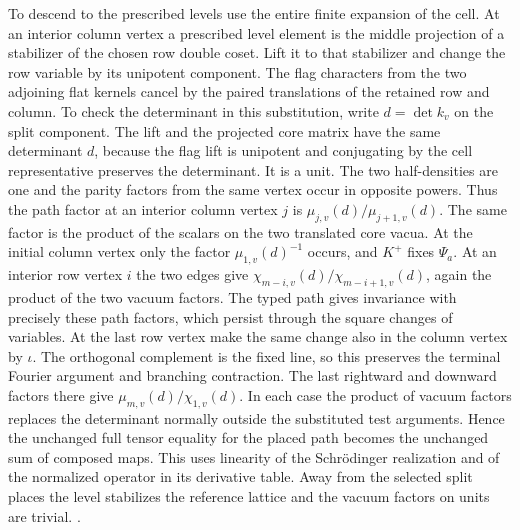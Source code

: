 To descend to the prescribed levels use the entire finite
expansion of the cell. At an interior column vertex a
prescribed level element is the middle projection of a
stabilizer of the chosen row double coset. Lift it to that
stabilizer and change the row variable by its unipotent
component. The flag characters from the two
adjoining flat kernels cancel by the paired translations of the
retained row and column. To check the determinant in this
substitution, write \(d=\det k_v\) on the split component.
The lift and the projected core matrix have the same
determinant \(d\), because the flag lift is unipotent and
conjugating by the cell representative preserves the
determinant. It is a unit. The two half-densities are
one and the parity factors from the same vertex occur
in opposite powers. Thus the path factor at an interior
column vertex \(j\) is
\(\mu_{j,v}(d)/\mu_{j+1,v}(d)\). The same factor is the
product of the scalars on the two translated core vacua.
At the initial column vertex only the factor
\(\mu_{1,v}(d)^{-1}\) occurs, and \(K^+\) fixes \(\Psi_a\).
At an interior row vertex \(i\) the two edges give
\(\chi_{m-i,v}(d)/\chi_{m-i+1,v}(d)\), again the product
of the two vacuum factors. The typed path gives invariance
with precisely these path factors, which persist through
the square changes of variables. At the last row vertex
make the same change also in the column vertex by \(\iota\).
The orthogonal complement is the fixed line, so this
preserves the terminal Fourier argument and branching
contraction. The last rightward and downward factors there
give \(\mu_{m,v}(d)/\chi_{1,v}(d)\). In each case the
product of vacuum factors replaces the determinant normally
outside the substituted test arguments. Hence the unchanged
full tensor equality for the placed path becomes the
unchanged sum of composed maps. This uses linearity of the
Schr\"odinger realization and of the normalized operator in
its derivative table. Away from the selected split places
the level stabilizes the reference lattice and the vacuum
factors on units are trivial.
.


